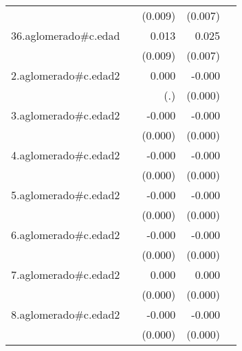 {\begin{longtable}{l*{4}{D{.}{.}{-1}}}
            &                     &     (0.009)         &     (0.007)         &                     \\
\addlinespace
36.aglomerado#c.edad&                     &       0.013         &       0.025\sym{***}&                     \\
            &                     &     (0.009)         &     (0.007)         &                     \\
\addlinespace
2.aglomerado#c.edad2&                     &       0.000         &      -0.000         &                     \\
            &                     &         (.)         &     (0.000)         &                     \\
\addlinespace
3.aglomerado#c.edad2&                     &      -0.000         &      -0.000\sym{*}  &                     \\
            &                     &     (0.000)         &     (0.000)         &                     \\
\addlinespace
4.aglomerado#c.edad2&                     &      -0.000         &      -0.000\sym{***}&                     \\
            &                     &     (0.000)         &     (0.000)         &                     \\
\addlinespace
5.aglomerado#c.edad2&                     &      -0.000         &      -0.000\sym{*}  &                     \\
            &                     &     (0.000)         &     (0.000)         &                     \\
\addlinespace
6.aglomerado#c.edad2&                     &      -0.000         &      -0.000         &                     \\
            &                     &     (0.000)         &     (0.000)         &                     \\
\addlinespace
7.aglomerado#c.edad2&                     &       0.000         &       0.000         &                     \\
            &                     &     (0.000)         &     (0.000)         &                     \\
\addlinespace
8.aglomerado#c.edad2&                     &      -0.000         &      -0.000\sym{*}  &                     \\
            &                     &     (0.000)         &     (0.000)         &                     \\

\end{longtable}}
